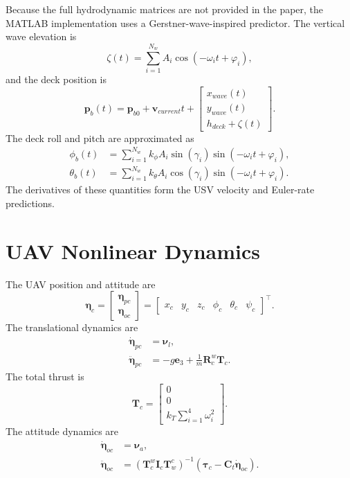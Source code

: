 \documentclass[12pt,a4paper]{report}
\begin{document}
Because the full hydrodynamic matrices are not provided in the paper, the MATLAB implementation uses a Gerstner-wave-inspired predictor. The vertical wave elevation is
\begin{equation}
\zeta(t)=\sum_{i=1}^{N_w}A_i\cos(-\omega_i t+\varphi_i),
\end{equation}
and the deck position is
\begin{equation}
\bm{p}_b(t)=\bm{p}_{b0}+\bm{v}_{current}t+
\begin{bmatrix}
x_{wave}(t)\\
y_{wave}(t)\\
h_{deck}+\zeta(t)
\end{bmatrix}.
\end{equation}
The deck roll and pitch are approximated as
\begin{align}
\phi_b(t)&=\sum_{i=1}^{N_w}k_\phi A_i\sin(\gamma_i)\sin(-\omega_i t+\varphi_i),\\
\theta_b(t)&=\sum_{i=1}^{N_w}k_\theta A_i\cos(\gamma_i)\sin(-\omega_i t+\varphi_i).
\end{align}
The derivatives of these quantities form the USV velocity and Euler-rate predictions.

\section{UAV Nonlinear Dynamics}
The UAV position and attitude are
\begin{equation}
\bm{\eta}_c=
\begin{bmatrix}
\bm{\eta}_{pc}\\
\bm{\eta}_{oc}
\end{bmatrix}
=
\begin{bmatrix}
x_c & y_c & z_c & \phi_c & \theta_c & \psi_c
\end{bmatrix}^{\top}.
\end{equation}
The translational dynamics are
\begin{align}
\dot{\bm{\eta}}_{pc}&=\bm{\nu}_l,\\
\ddot{\bm{\eta}}_{pc}&=-g\bm{e}_3+\frac{1}{m}\bm{R}^{w}_{c}\bm{T}_c.
\end{align}
The total thrust is
\begin{equation}
\bm{T}_c=
\begin{bmatrix}
0\\0\\k_T\sum_{i=1}^{4}\omega_i^2
\end{bmatrix}.
\end{equation}
The attitude dynamics are
\begin{align}
\dot{\bm{\eta}}_{oc}&=\bm{\nu}_a,\\
\ddot{\bm{\eta}}_{oc}
&=
\left(\bm{T}^{w}_{c}\bm{I}_{c}\bm{T}^{c}_{w}\right)^{-1}
\left(\bm{\tau}_{c}-\bm{C}_{t}\dot{\bm{\eta}}_{oc}\right).
\end{align}
\end{document}
